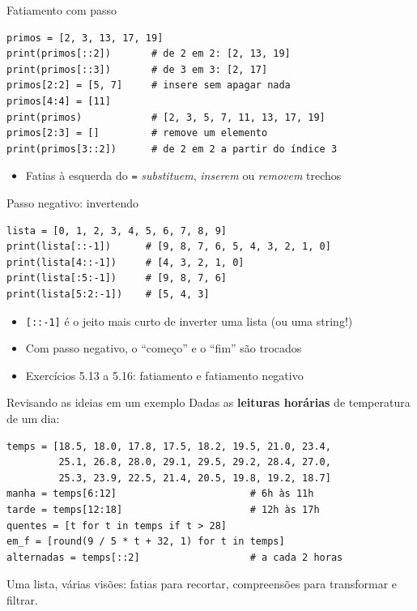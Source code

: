 \documentclass[aspectratio=169,10pt,t]{beamer}
\begin{document}
\begin{frame}[fragile]{Fatiamento com passo}
\begin{lstlisting}
primos = [2, 3, 13, 17, 19]
print(primos[::2])       # de 2 em 2: [2, 13, 19]
print(primos[::3])       # de 3 em 3: [2, 17]
primos[2:2] = [5, 7]     # insere sem apagar nada
primos[4:4] = [11]
print(primos)            # [2, 3, 5, 7, 11, 13, 17, 19]
primos[2:3] = []         # remove um elemento
print(primos[3::2])      # de 2 em 2 a partir do índice 3
\end{lstlisting}
  \begin{itemize}
    \item Fatias à esquerda do \texttt{=} \emph{substituem}, \emph{inserem} ou \emph{removem} trechos
  \end{itemize}
\end{frame}

\begin{frame}[fragile]{Passo negativo: invertendo}
\begin{lstlisting}
lista = [0, 1, 2, 3, 4, 5, 6, 7, 8, 9]
print(lista[::-1])      # [9, 8, 7, 6, 5, 4, 3, 2, 1, 0]
print(lista[4::-1])     # [4, 3, 2, 1, 0]
print(lista[:5:-1])     # [9, 8, 7, 6]
print(lista[5:2:-1])    # [5, 4, 3]
\end{lstlisting}
  \begin{itemize}
    \item \texttt{[::-1]} é o jeito mais curto de inverter uma lista (ou uma string!)
    \item Com passo negativo, o ``começo'' e o ``fim'' são trocados
    \item Exercícios 5.13 a 5.16: fatiamento e fatiamento negativo
  \end{itemize}
\end{frame}

\begin{frame}[fragile]{Revisando as ideias em um exemplo}
  Dadas as \textbf{leituras horárias} de temperatura de um dia:
\begin{lstlisting}
temps = [18.5, 18.0, 17.8, 17.5, 18.2, 19.5, 21.0, 23.4,
         25.1, 26.8, 28.0, 29.1, 29.5, 29.2, 28.4, 27.0,
         25.3, 23.9, 22.5, 21.4, 20.5, 19.8, 19.2, 18.7]
manha = temps[6:12]                       # 6h às 11h
tarde = temps[12:18]                      # 12h às 17h
quentes = [t for t in temps if t > 28]
em_f = [round(9 / 5 * t + 32, 1) for t in temps]
alternadas = temps[::2]                   # a cada 2 horas
\end{lstlisting}
  \small Uma lista, várias visões: fatias para recortar, compreensões para transformar e filtrar.
\end{frame}
\end{document}
